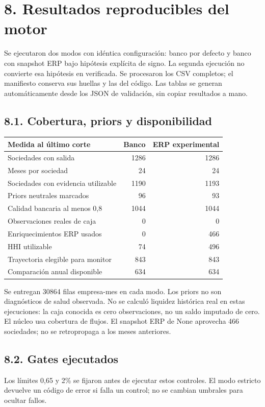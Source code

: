 \section*{8. Resultados reproducibles del motor}
Se ejecutaron dos modos con idéntica configuración: banco por defecto y banco con snapshot ERP bajo hipótesis explícita de signo. La segunda ejecución no convierte esa hipótesis en verificada. Se procesaron los CSV completos; el manifiesto conserva sus huellas y las del código. Las tablas se generan automáticamente desde los JSON de validación, sin copiar resultados a mano.

\subsection*{8.1. Cobertura, priors y disponibilidad}

\begin{center}
\small
\begin{tabular}{p{10cm}rr}
\hline
Medida al último corte & Banco & ERP experimental \\
\hline
Sociedades con salida & 1286 & 1286 \\
Meses por sociedad & 24 & 24 \\
Sociedades con evidencia utilizable & 1190 & 1193 \\
Priors neutrales marcados & 96 & 93 \\
Calidad bancaria al menos 0,8 & 1044 & 1044 \\
Observaciones reales de caja & 0 & 0 \\
Enriquecimientos ERP usados & 0 & 466 \\
HHI utilizable & 74 & 496 \\
Trayectoria elegible para monitor & 843 & 843 \\
Comparación anual disponible & 634 & 634 \\
\hline
\end{tabular}
\end{center}

Se entregan 30864 filas empresa-mes en cada modo. Los priors no son diagnósticos de salud observada. No se calculó liquidez histórica real en estas ejecuciones: la caja conocida es cero observaciones, no un saldo imputado de cero. El núcleo usa cobertura de flujos. El snapshot ERP de None aprovecha 466 sociedades; no se retropropaga a los meses anteriores.

\subsection*{8.2. Gates ejecutados}
Los límites 0,65 y 2\% se fijaron antes de ejecutar estos controles. El modo estricto devuelve un código de error si falla un control; no se cambian umbrales para ocultar fallos.

